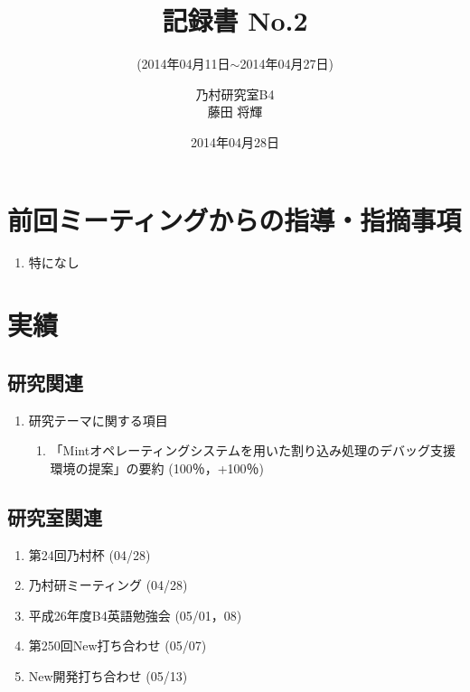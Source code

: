 \documentclass[fleqn, 14pt]{extarticle}
\subtitle{(2014年04月11日$\sim$2014年04月27日)}
\author{乃村研究室B4\\藤田 将輝}
\date{2014年04月28日}
\title{記録書 No.2}
\begin{document}
\maketitle




\section{前回ミーティングからの指導・指摘事項}
\label{sec-1}
\begin{enumerate}
\item 特になし
\end{enumerate}




\section{実績}
\label{sec-2}


\subsection{研究関連}
\label{sec-2-1}
\begin{enumerate}
\item 研究テーマに関する項目
\hfill
\label{enum-research1}
\begin{enumerate}

\item 「Mintオペレーティングシステムを用いた割り込み処理のデバッグ支援環境の提案」の要約
\hfill
\label{enum-1-A}
(100％，+100％)
\end{enumerate}
\end{enumerate}


\subsection{研究室関連}
\label{sec-2-2}

\begin{enumerate}
\item 第24回乃村杯
\hfill
\label{enum-laboratory1}
(04/28)
\item 乃村研ミーティング
\hfill
\label{enum-laboratory2}
(04/28)
\item 平成26年度B4英語勉強会
\hfill
\label{enum-laboratory3}
(05/01，08)
\item 第250回New打ち合わせ
\hfill
\label{enum-laboratory4}
(05/07)
\item New開発打ち合わせ
\hfill
\label{enum-laboratory5}
(05/13)
\end{enumerate}
\end{document}
